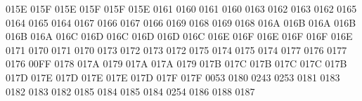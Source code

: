 \setcclcucx 015E 015F 015E %
\setcclcucx 015F 015F 015E %
 0161 0160 %
 0161 0160 %
 0163 0162 %
 0163 0162 %
 0165 0164 %
 0165 0164 %
 0167 0166 %
 0167 0166 %
 0169 0168 %
 0169 0168 %
\setcclcucx 016A 016B 016A %
\setcclcucx 016B 016B 016A %
\setcclcucx 016C 016D 016C %
\setcclcucx 016D 016D 016C %
\setcclcucx 016E 016F 016E %
\setcclcucx 016F 016F 016E %
 0171 0170 %
 0171 0170 %
 0173 0172 %
 0173 0172 %
 0175 0174 %
 0175 0174 %
 0177 0176 %
 0177 0176 %
 00FF 0178 %
 017A 0179 %
\setcclcucx 017A 017A 0179 %
\setcclcucx 017B 017C 017B %
\setcclcucx 017C 017C 017B %
\setcclcucx 017D 017E 017D %
\setcclcucx 017E 017E 017D %
\setcclcucx 017F 017F 0053 %
 0180 0243 %
 0253 0181 %
 0183 0182 %
 0183 0182 %
 0185 0184 %
 0185 0184 %
 0254 0186 %
 0188 0187 %

